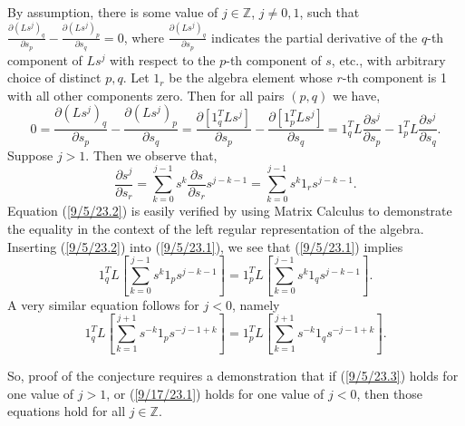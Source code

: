 \documentclass{amsart}
\numberwithin{equation}{section}
\theoremstyle{definition}
\numberwithin{theorem}{section}
\begin{document}
By assumption, there is some value of $j\in\mathbb{Z}$, $j\ne 0,1$, such that $\frac{\partial (Ls^j)_q}{\partial s_p} -  \frac{\partial (Ls^j)_p}{\partial s_q} = 0$, where $\frac{\partial (Ls^j)_q}{\partial s_p}$ indicates the partial derivative of the $q$-th component of $Ls^j$ with respect to the $p$-th component of $s$, etc., with arbitrary choice of distinct $p,q$.  Let $1_r$ be the algebra element whose $r$-th component is 1 with all other components zero.  Then for all pairs $(p,q)$ we have, \begin{equation}\label{9/5/23.1} 0 = \frac{\partial (Ls^j)_q}{\partial s_p} -  \frac{\partial (Ls^j)_p}{\partial s_q} =  \frac{\partial [1_q^T Ls^j]}{\partial s_p} -  \frac{\partial [1_p^T Ls^j]}{\partial s_q} =  1_q^T L\frac{\partial s^j}{\partial s_p} -  1_p^T L\frac{\partial s^j}{\partial s_q}. \end{equation}
Suppose $j>1$.  Then we observe that, \begin{equation}\label{9/5/23.2} \frac{\partial s^j}{\partial s_r}
= \sum_{k=0}^{j-1} s^k \frac{\partial s}{\partial s_r}  s^{j-k-1} = \sum_{k=0}^{j-1} s^k 1_r  s^{j-k-1}.\end{equation}
 Equation (\ref{9/5/23.2}) is easily verified by using Matrix Calculus to demonstrate the equality in the context of the left regular representation of the algebra. Inserting (\ref{9/5/23.2}) into (\ref{9/5/23.1}), we see that (\ref{9/5/23.1}) implies
\begin{equation}\label{9/5/23.3} 1_q^T L\left[ \sum_{k=0}^{j-1} s^k  1_p  s^{j-k-1}\right]
= 1_p^T L\left[ \sum_{k=0}^{j-1} s^k  1_q  s^{j-k-1}\right].\end{equation} A very similar equation follows for $j<0$, namely
\begin{equation}\label{9/17/23.1} 1_q^T L\left[ \sum_{k=1}^{j+1} s^{-k}  1_p  s^{-j-1+k}\right]
= 1_p^T L\left[ \sum_{k=1}^{j+1} s^{-k}  1_q  s^{-j-1+k}\right].\end{equation}

So, proof of the conjecture requires a demonstration that if (\ref{9/5/23.3}) holds for one value of $j>1$, or (\ref{9/17/23.1}) holds for one value of $j<0$, then those equations hold for all $j\in\mathbb{Z}$.

  
 
\end{document}
